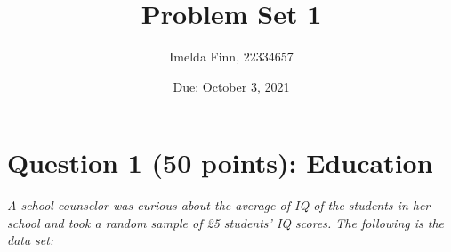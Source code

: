 \documentclass[12pt,letterpaper]{article}
\title{Problem Set 1}
\date{Due: October 3, 2021}
\author{Imelda Finn, 22334657}
\begin{document}
	\maketitle

\begin{comment}	
	\section*{Instructions}
	\begin{itemize}
		\item Please show your work! You may lose points by simply writing in the answer. If the problem requires you to execute commands in \texttt{R}, please include the code you used to get your answers. Please also include the \texttt{.R} file that contains your code. If you are not sure if work needs to be shown for a particular problem, please ask.
		\item Your homework should be submitted electronically on GitHub in \texttt{.pdf} form.
		\item This problem set is due before 8:00 on Friday October 3, 2021. No late assignments will be accepted.
		\item Total available points for this homework is 100.
	\end{itemize}
\end{comment}


	\vspace{1cm}
	\section*{Question 1 (50 points): Education}
	
	\emph{A school counselor was curious about the average of IQ of the students in her school and took a random sample of 25 students' IQ scores. The following is the data set:}\\
	\vspace{.5cm}
	
	  
	
	\vspace{.5cm}
	
\end{document}
